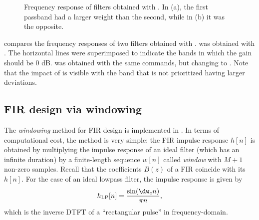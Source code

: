 \begin{figure}
 \centering
  \caption[{Frequency response of filters obtained with .}]{Frequency response of filters obtained with . In (a), the first passband had a larger weight than the second, while in (b) it was the opposite.}
  \label{fig:fir_bands}
\end{figure}

 compares the frequency responses of two filters obtained with .  was obtained with .
The horizontal lines were superimposed to indicate the bands in which the gain should be 0 dB.
 was obtained with the same commands, but changing  to . Note that the impact of  is visible with the band that is not prioritized having larger deviations.

\subsection{FIR design via windowing}
\label{subsec:fir_windowing}

The \emph{windowing} method for FIR design is implemented in .
In terms of computational cost, the method is very simple: the FIR impulse response $h[n]$ is obtained by multiplying the impulse response of an ideal filter (which has an infinite duration) by a finite-length sequence $w[n]$ called \emph{window} with $M+1$ non-zero samples. Recall that the coefficients $B(z)$ of a FIR coincide with its $h[n]$.
For the case of an ideal lowpass filter, the impulse response is given by
\begin{equation}
h_{\textrm{LP}}[n] = \frac{\sin(\dw_c n)}{\pi n},
\label{eq:idealLowpass}
\end{equation}
which is the inverse DTFT of a ``rectangular pulse'' in frequency-domain.

